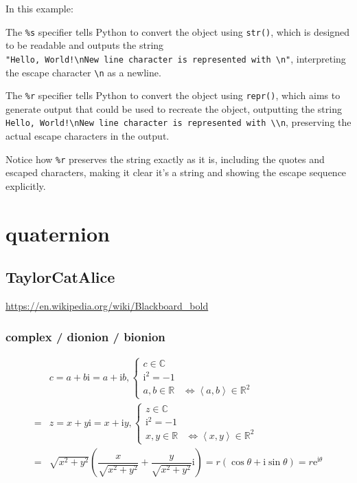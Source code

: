 \documentclass[
]{book}
\theoremstyle{definition}
\theoremstyle{definition}
\theoremstyle{definition}
\theoremstyle{definition}
\theoremstyle{remark}
\begin{document}
In this example:

The \texttt{\%s} specifier tells Python to convert the object using \texttt{str()}, which is designed to be readable and outputs the string \texttt{"Hello,\ World!\textbackslash{}nNew\ line\ character\ is\ represented\ with\ \textbackslash{}n"}, interpreting the escape character \texttt{\textbackslash{}n} as a newline.

The \texttt{\%r} specifier tells Python to convert the object using \texttt{repr()}, which aims to generate output that could be used to recreate the object, outputting the string \texttt{\textquotesingle{}Hello,\ World!\textbackslash{}nNew\ line\ character\ is\ represented\ with\ \textbackslash{}\textbackslash{}n\textquotesingle{}}, preserving the actual escape characters in the output.

Notice how \texttt{\%r} preserves the string exactly as it is, including the quotes and escaped characters, making it clear it's a string and showing the escape sequence explicitly.

\chapter{quaternion}\label{quaternion}

\section{TaylorCatAlice}\label{taylorcatalice}

\url{https://en.wikipedia.org/wiki/Blackboard_bold}

\subsection{complex / dionion / bionion}\label{complex-dionion-bionion}

\[
\begin{aligned}
 & c=a+b\mathrm{i}=a+\mathrm{i}b,\begin{cases}
c\in\mathbb{C}\\
\mathrm{i}^{2}=-1\\
a,b\in\mathbb{R} & \Leftrightarrow\left\langle a,b\right\rangle \in\mathbb{R}^{2}
\end{cases}\\
= & z=x+y\mathrm{i}=x+\mathrm{i}y,\begin{cases}
z\in\mathbb{C}\\
\mathrm{i}^{2}=-1\\
x,y\in\mathbb{R} & \Leftrightarrow\left\langle x,y\right\rangle \in\mathbb{R}^{2}
\end{cases}\\
= & \sqrt{x^{2}+y^{2}}\left(\dfrac{x}{\sqrt{x^{2}+y^{2}}}+\dfrac{y}{\sqrt{x^{2}+y^{2}}}\mathrm{i}\right)=r\left(\cos\theta+\mathrm{i}\sin\theta\right)=r\mathrm{e}^{\mathrm{i}\theta}
\end{aligned}
\]
\end{document}
